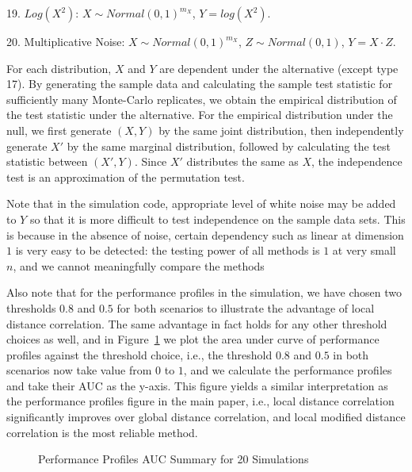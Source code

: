 \documentclass[12pt]{article}
\begin{document}
19. $Log(X^2)$: $X \sim Normal(0, 1)^{m_{X}}$, $Y=log(X^2)$.

20. Multiplicative Noise: $X \sim Normal(0, 1)^{m_{X}}$, $Z \sim Normal(0, 1)$, $Y=X \cdot Z$.

For each distribution, $X$ and $Y$ are dependent under the alternative (except type 17). By generating the sample data and calculating the sample test statistic for sufficiently many Monte-Carlo replicates, we obtain the empirical distribution of the test statistic under the alternative. For the empirical distribution under the null, we first generate $(X,Y)$ by the same joint distribution, then independently generate $X'$ by the same marginal distribution, followed by calculating the test statistic between $(X',Y)$. Since $X'$ distributes the same as $X$, the independence test is an approximation of the permutation test.

Note that in the simulation code, appropriate level of white noise may be added to $Y$ so that it is more difficult to test independence on the sample data sets. This is because in the absence of noise, certain dependency such as linear at dimension $1$ is very easy to be detected: the testing power of all methods is $1$ at very small $n$, and we cannot meaningfully compare the methods

Also note that for the performance profiles in the simulation, we have chosen two thresholds $0.8$ and $0.5$ for both scenarios to illustrate the advantage of local distance correlation. The same advantage in fact holds for any other threshold choices as well, and in Figure~\ref{figSim4} we plot the area under curve of performance profiles against the threshold choice, i.e., the threshold $0.8$ and $0.5$ in both scenarios now take value from $0$ to $1$, and we calculate the performance profiles and take their AUC as the y-axis. This figure yields a similar interpretation as the performance profiles figure in the main paper, i.e., local distance correlation significantly improves over global distance correlation, and local modified distance correlation is the most reliable method.

\begin{figure}[htbp]
\hfil
{}
\caption{Performance Profiles AUC Summary for 20 Simulations}
\label{figSim4}
\end{figure}




\end{document}

